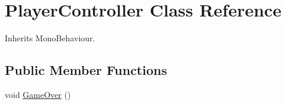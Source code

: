 \hypertarget{class_player_controller}{}\section{Player\+Controller Class Reference}
\label{class_player_controller}


Inherits Mono\+Behaviour.

\subsection*{Public Member Functions}
\begin{DoxyCompactItemize}
\item 
void \mbox{\hyperlink{class_player_controller_a022c877a529497a8fdb3fcf7e21cf090}{Game\+Over}} ()
\end{DoxyCompactItemize}
